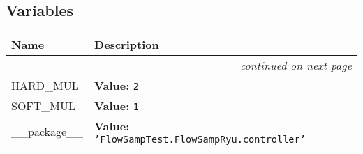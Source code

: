 
  \subsection{Variables}

    \vspace{-1cm}
\hspace{\varindent}\begin{longtable}{|p{\varnamewidth}|p{\vardescrwidth}|l}
\cline{1-2}
\cline{1-2} \centering \textbf{Name} & \centering \textbf{Description}& \\
\cline{1-2}
\endhead\cline{1-2}\multicolumn{3}{r}{\small\textit{continued on next page}}\\\endfoot\cline{1-2}
\endlastfoot\raggedright H\-A\-R\-D\-\_\-M\-U\-L\- & \raggedright \textbf{Value:} 
{\tt 2}&\\
\cline{1-2}
\raggedright S\-O\-F\-T\-\_\-M\-U\-L\- & \raggedright \textbf{Value:} 
{\tt 1}&\\
\cline{1-2}
\raggedright \_\-\_\-p\-a\-c\-k\-a\-g\-e\-\_\-\_\- & \raggedright \textbf{Value:} 
{\tt \texttt{'}\texttt{FlowSampTest.FlowSampRyu.controller}\texttt{'}}&\\
\cline{1-2}
\end{longtable}

